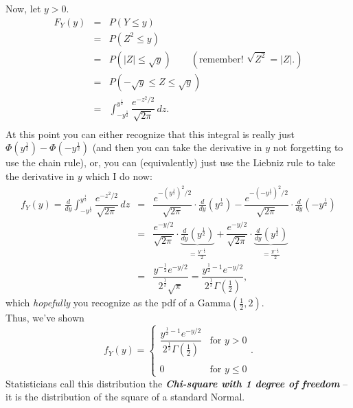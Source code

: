 \documentclass[12pt]{article}
\begin{document}
\noindent Now, let $y> 0$.
\begin{eqnarray*}
F_Y(y) & = & P(Y\le y)\\
&=& P(Z^2\le y)\\
&=& P(|Z|\le \sqrt{y}) \qquad (\mbox{remember! }\sqrt{Z^2}=|Z|.)\\
&=& P(-\sqrt{y}\le Z\le \sqrt{y})\\
&=& \int_{-y^{\frac 12}}^{y^{\frac 12}} \dfrac {e^{-z^2/2}}{\sqrt{2\pi}}\,dz.\\
\end{eqnarray*}
At this point you can either recognize that this integral is really just $\Phi(y^{\frac 12}) - \Phi(-y^{\frac 12})$ (and then you can take the derivative in $y$ not forgetting to use the chain rule), or, you can (equivalently) just use the Liebniz rule
to take the derivative in $y$ which I do now:
\begin{eqnarray*}f_Y(y)=\frac d{dy}\int_{-y^{\frac 12}}^{y^{\frac 12}} \dfrac {e^{-z^2/2}}{\sqrt{2\pi}}\,dz
&=& \dfrac {e^{-\left(y^{\frac 12}\right)^2/2}}{\sqrt{2\pi}}\cdot \frac d{dy}\left(y^{\frac 12}\right) -
\dfrac {e^{-\left(-y^{\frac 12}\right)^2/2}}{\sqrt{2\pi}}\cdot \frac d{dy}\left(-y^{\frac 12}\right)\\
&=& \dfrac {e^{-y/2}}{\sqrt{2\pi}}\cdot \underbrace{\frac d{dy}\left(y^{\frac 12}\right)}_{=\frac {y^{-\frac 12}}2} +
\dfrac {e^{-y/2}}{\sqrt{2\pi}}\cdot \underbrace{\frac d{dy}\left(y^{\frac 12}\right)}_{=\frac {y^{-\frac 12}}2}\\
&=& \dfrac {y^{-\frac 12}e^{-y/2}}{2^{\frac 12}\sqrt{\pi}} =  \dfrac {y^{\frac 12 - 1}e^{-y/2}}{2^{\frac 12}\Gamma(\frac 12)},
\end{eqnarray*}
which {\em hopefully} you recognize as the pdf of a Gamma$(\frac 12,2)$.\\

\noindent Thus, we've shown
$$f_Y(y) = \left\{\begin{array}{cl} \dfrac {y^{\frac 12 - 1}e^{-y/2}}{2^{\frac 12}\Gamma(\frac 12)} & \mbox{for }y>0 \\  & \\ 0 & \mbox{for }y\le 0 \end{array}\right..$$
Statisticians call this distribution the {\bf\em Chi-square with 1 degree of freedom}\label{chisquare1} -- it is the distribution of the square of a standard Normal.\\

\newpage

\\
\end{document}
